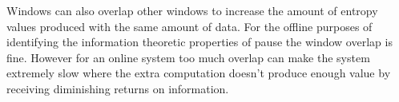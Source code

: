 Windows can also overlap other windows to increase the amount of entropy values produced with the same amount of data. For the offline purposes of identifying the information theoretic properties of pause the window overlap is fine. However for an online system too much overlap can make the system extremely slow where the extra computation doesn't produce enough value by receiving diminishing returns on information. \\






